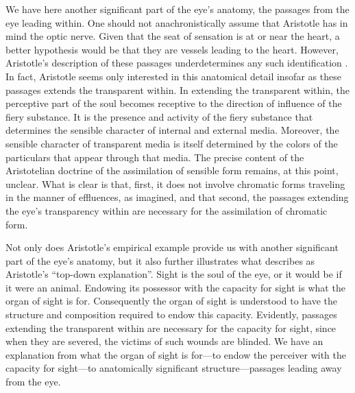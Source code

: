 We have here another significant part of the eye's anatomy, the passages from the eye leading within. One should not anachronistically assume that Aristotle has in mind the optic nerve. Given that the seat of sensation is at or near the heart, a better hypothesis would be that they are vessels leading to the heart. However, Aristotle's description of these passages underdetermines any such identification \citep[see][]{Lloyd:1978fk}. In fact, Aristotle seems only interested in this anatomical detail insofar as these passages extends the transparent within. In extending the transparent within, the perceptive part of the soul becomes receptive to the direction of influence of the fiery substance. It is the presence and activity of the fiery substance that determines the sensible character of internal and external media. Moreover, the sensible character of transparent media is itself determined by the colors of the particulars that appear through that media. The precise content of the Aristotelian doctrine of the assimilation of sensible form remains, at this point, unclear. What is clear is that, first, it does not involve chromatic forms traveling in the manner of effluences, as \citet[\textsc{i} 1]{Hobbes:1651fk} imagined, and that second, the passages extending the eye's transparency within are necessary for the assimilation of chromatic form. 

Not only does Aristotle's empirical example provide us with another significant part of the eye's anatomy, but it also further illustrates what \citet{Johansen:1997zr} describes as Aristotle's ``top-down explanation''. Sight is the soul of the eye, or it would be if it were an animal. Endowing its possessor with the capacity for sight is what the organ of sight is for. Consequently the organ of sight is understood to have the structure and composition required to endow this capacity. Evidently, passages extending the transparent within are necessary for the capacity for sight, since when they are severed, the victims of such wounds are blinded. We have an explanation from what the organ of sight is for---to endow the perceiver with the capacity for sight---to anatomically significant structure---passages leading away from the eye.

